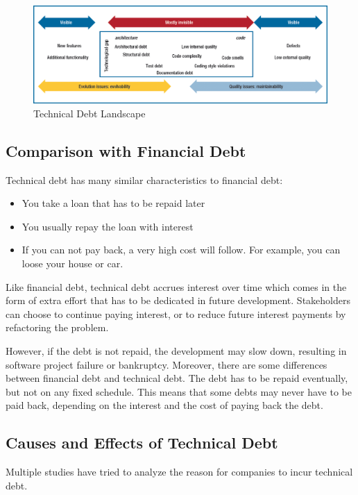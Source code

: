 \begin{figure}[ht!]
	\centering
	\includegraphics[width=1.0\textwidth]{images/techDebtLandscape.png}
	\caption{Technical Debt Landscape}
	\label{fig:techDebtLandscape}
\end{figure}

\subsection{Comparison with Financial Debt}
Technical debt has many similar characteristics to financial debt\cite{p50-allman,Zazworka:2011:PDD:1985362.1985372}:
\begin{itemize}
	\item You take a loan that has to be repaid later
	\item You usually repay the loan with interest
	\item If you can not pay back, a very high cost will follow. For example, you can loose your house or car.
\end{itemize}

Like financial debt, technical debt accrues interest over time which comes in the form of extra effort that has to be dedicated in future development\cite{p31-guo,p35-klinger}. Stakeholders can choose to continue paying interest, or to reduce future interest payments by refactoring the problem\cite{url-fowler}. 


However, if the debt is not repaid, the development may slow down, resulting in software project failure or bankruptcy\cite{p50-allman}. Moreover, there are some differences between financial debt and technical debt. The debt has to be repaid eventually, but not on any fixed schedule\cite{p50-allman}. This means that some debts may never have to be paid back, depending on the interest and the cost of paying back the debt\cite{foser076-brown}.


\subsection{Causes and Effects of Technical Debt}
Multiple studies have tried to analyze the reason for companies to incur technical debt.

